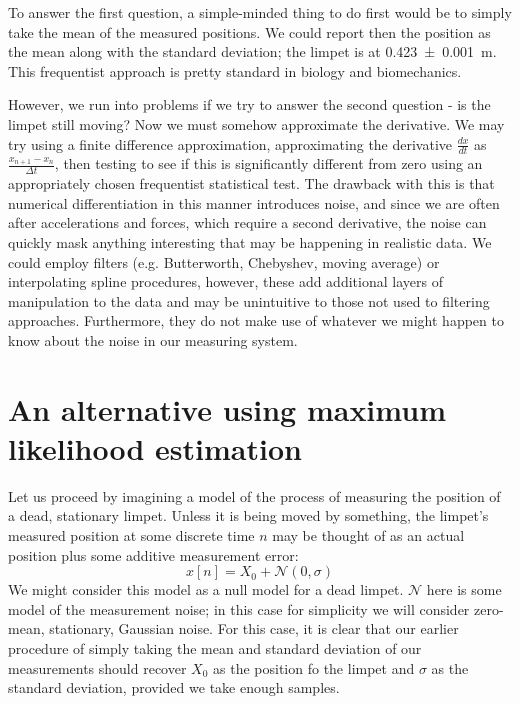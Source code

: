 To answer the first question, a simple-minded thing to do first would be to simply take the mean of the measured positions.  We could report then the position as the mean along with the standard deviation; the limpet is at \SI[separate-uncertainty]{0.423+-0.001}{\meter}.  This frequentist approach is pretty standard in biology and biomechanics.  

However, we run into problems if we try to answer the second question - is the limpet still moving?  Now we must somehow approximate the derivative.  We may try using a finite difference approximation, approximating the derivative $\frac{dx}{dt}$ as $\frac{x_{n+1}-x_{n}}{\Delta t}$, then testing to see if this is significantly different from zero using an appropriately chosen frequentist statistical test.  The drawback with this is that numerical differentiation in this manner introduces noise, and since we are often after accelerations and forces, which require a second derivative, the noise can quickly mask anything interesting that may be happening in realistic data.  We could employ filters (e.g. Butterworth, Chebyshev, moving average) or interpolating spline procedures, however, these add additional layers of manipulation to the data and may be unintuitive to those not used to filtering approaches.  Furthermore, they do not make use of whatever we might happen to know about the noise in our measuring system. 

\section{An alternative using maximum likelihood estimation}
Let us proceed by imagining a model of the process of measuring the position of a dead, stationary limpet.  Unless it is being moved by something, the limpet's measured position at some discrete time $n$ may be thought of as an actual position plus some additive measurement error:
\begin{equation}
x[n] = X_0 + \mathcal{N}(0,\sigma)
\end{equation}
We might consider this model as a null model for a dead limpet.  $\mathcal{N}$ here is some model of the measurement noise; in this case for simplicity we will consider zero-mean, stationary, Gaussian noise.  For this case, it is clear that our earlier procedure of simply taking the mean and standard deviation of our measurements should recover $X_0$ as the position fo the limpet and $\sigma$ as the standard deviation, provided we take enough samples. 

